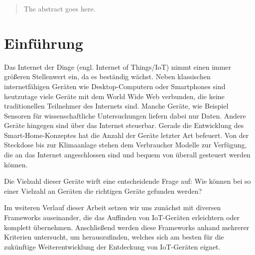 \documentclass[conference,compsoc]{IEEEtran}
\begin{document}




\maketitle

\begin{abstract}
The abstract goes here.
\end{abstract}





%
\IEEEpeerreviewmaketitle



\section{Einführung}
Das Internet der Dinge (engl. Internet of Things/IoT) nimmt einen immer größeren Stellenwert ein, da es beständig wächst. Neben klassischen internetfähigen Geräten wie Desktop-Computern oder Smartphones sind heutzutage viele Geräte mit dem World Wide Web verbunden, die keine traditionellen Teilnehmer des Internets sind. Manche Geräte, wie Beispiel Sensoren für wissenschaftliche Untersuchungen liefern dabei nur Daten. Andere Geräte hingegen sind über das Internet steuerbar.
Gerade die Entwicklung des Smart-Home-Konzeptes hat die Anzahl der Geräte letzter Art befeuert. Von der Steckdose bis zur Klimaanlage stehen dem Verbraucher Modelle zur Verfügung, die an das Internet angeschlossen sind und bequem von überall gesteuert werden können.

Die Vielzahl dieser Geräte wirft eine entscheidende Frage auf: Wie können bei so einer Vielzahl an Geräten die richtigen Geräte gefunden werden?

Im weiteren Verlauf dieser Arbeit setzen wir uns zunächst mit diversen Frameworks auseinander, die das Auffinden von IoT-Geräten erleichtern oder komplett übernehmen. Anschließend werden diese Frameworks anhand mehrerer Kriterien untersucht, um herauszufinden, welches sich am besten für die zukünftige Weiterentwicklung der Entdeckung von IoT-Geräten eignet.
\end{document}
